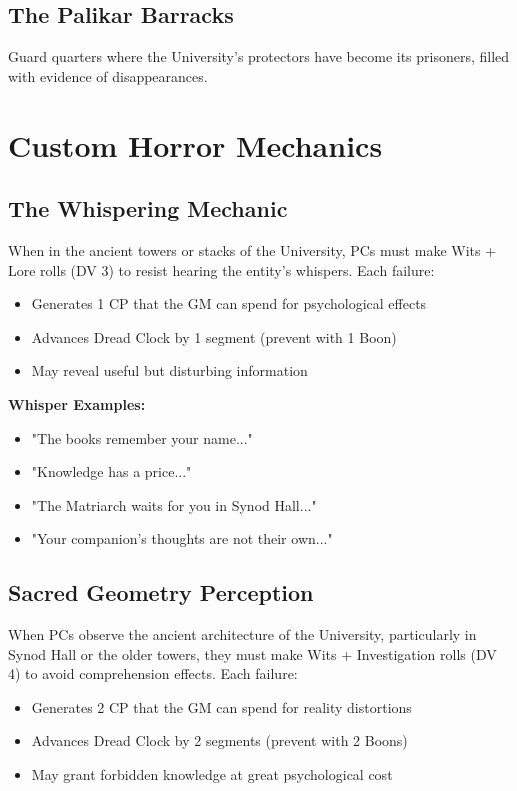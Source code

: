 \documentclass[11pt]{article}
\begin{document}
\subsection{The Palikar Barracks}

Guard quarters where the University's protectors have become its prisoners, filled with evidence of disappearances.

\section{Custom Horror Mechanics}

\subsection{The Whispering Mechanic}

When in the ancient towers or stacks of the University, PCs must make Wits + Lore rolls (DV 3) to resist hearing the entity's whispers. Each failure:
\begin{itemize}
\item Generates 1 CP that the GM can spend for psychological effects
\item Advances Dread Clock by 1 segment (prevent with 1 Boon)
\item May reveal useful but disturbing information
\end{itemize}

\textbf{Whisper Examples:}
\begin{itemize}
\item "The books remember your name..."
\item "Knowledge has a price..."
\item "The Matriarch waits for you in Synod Hall..."
\item "Your companion's thoughts are not their own..."
\end{itemize}

\subsection{Sacred Geometry Perception}

When PCs observe the ancient architecture of the University, particularly in Synod Hall or the older towers, they must make Wits + Investigation rolls (DV 4) to avoid comprehension effects. Each failure:
\begin{itemize}
\item Generates 2 CP that the GM can spend for reality distortions
\item Advances Dread Clock by 2 segments (prevent with 2 Boons)
\item May grant forbidden knowledge at great psychological cost
\end{itemize}
\end{document}

